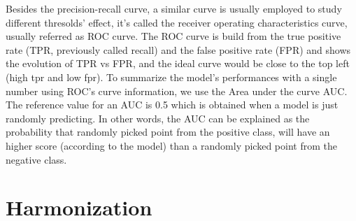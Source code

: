 \documentclass[a4paper,11pt]{article}
\begin{document}
Besides the precision-recall curve, a similar curve is usually employed to study different thresolds' effect, it's called the receiver operating characteristics curve, usually referred as ROC curve.
The ROC curve is build from the true positive rate (TPR, previously called recall) and the false positive rate (FPR) and shows the evolution of TPR vs FPR, and the ideal curve would be close to the top left (high tpr and low fpr). To summarize the model's performances with a single number using ROC's curve information, we use the Area under the curve AUC. The reference value for an AUC is 0.5 which is obtained when a model is just randomly predicting.
In other words, the AUC can be explained as the probability that randomly picked point from the positive class, will have an higher score (according to the model) than a randomly picked point from the negative class.




\section{Harmonization}
\end{document}
